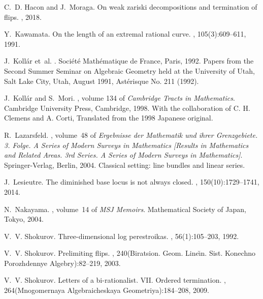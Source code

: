 \documentclass[11pt]{amsart}
\begin{document}
\begin{thebibliography}{10}
	C.~D. Hacon and J.~Moraga.
	\newblock On weak zariski decompositions and termination of flips.
	, 2018.


	
	Y.~Kawamata.
	\newblock On the length of an extremal rational curve.
	, 105(3):609--611, 1991.
	
	J.~Koll\'ar et~al.
	.
	\newblock Soci\'et\'e Math\'ematique de France, Paris, 1992.
	\newblock Papers from the Second Summer Seminar on Algebraic Geometry held at
	the University of Utah, Salt Lake City, Utah, August 1991, Ast\'erisque No.
	211 (1992).
	
	J.~Koll\'ar and S.~Mori.
	, volume 134 of {\em
		Cambridge Tracts in Mathematics}.
	\newblock Cambridge University Press, Cambridge, 1998.
	\newblock With the collaboration of C. H. Clemens and A. Corti, Translated from
	the 1998 Japanese original.
	
	R.~Lazarsfeld.
	, volume~48 of {\em
		Ergebnisse der Mathematik und ihrer Grenzgebiete. 3. Folge. A Series of
		Modern Surveys in Mathematics [Results in Mathematics and Related Areas. 3rd
		Series. A Series of Modern Surveys in Mathematics]}.
	\newblock Springer-Verlag, Berlin, 2004.
	\newblock Classical setting: line bundles and linear series.
	
	J.~Lesieutre.
	\newblock The diminished base locus is not always closed.
	, 150(10):1729--1741, 2014.
	
	
	N.~Nakayama.
	, volume~14 of {\em MSJ
		Memoirs}.
	\newblock Mathematical Society of Japan, Tokyo, 2004.
	
	V.~V. Shokurov.
	\newblock Three-dimensional log perestroikas.
	, 56(1):105--203, 1992.
	
	V.~V. Shokurov.
	\newblock Prelimiting flips.
	, 240(Biratsion. Geom. Line\u\i n. Sist.
	Konechno Porozhdennye Algebry):82--219, 2003.
	
	V.~V. Shokurov.
	\newblock Letters of a bi-rationalist. {VII}. {O}rdered termination.
	, 264(Mnogomernaya Algebraicheskaya
	Geometriya):184--208, 2009.
	

\end{thebibliography}
\end{document}
